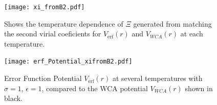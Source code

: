 \documentclass[double,12pt]{beavtex}
\begin{document}
\begin{figure}[h!]
    \centering
    \texttt{[image: xi\_fromB2.pdf]}
    \caption{Shows the temperature dependence of $\Xi$ generated from 
    matching the second virial coeficients for $V_{\operatorname{erf}}(r)$ and $V_{WCA}(r)$ 
    at each temperature.}
    \label{fig:xi_fromB2vsT}
  \end{figure}

\begin{figure}[h!]
    \centering
    \texttt{[image: erf\_Potential\_xifromB2.pdf]}
    \caption{Error Function Potential $V_{\operatorname{erf}}(r)$ at several temperatures 
    with $\sigma=1$, $\epsilon=1$, compared to the WCA potential $V_{WCA}(r)$ 
    shown in black.}
    \label{fig:erf_Potential_xifromB2}
  \end{figure}




\end{document}
